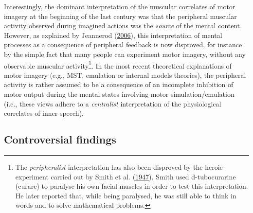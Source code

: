 \documentclass[a4paper,12pt,twoside,openright,oldfontcommands]{memoir}
\let\rmarkdownfootnote\footnote%
\def\footnote{\protect\rmarkdownfootnote}
\begin{document}
Interestingly, the dominant interpretation of the muscular correlates of motor imagery at the beginning of the last century was that the peripheral muscular activity observed during imagined actions was the \emph{source} of the mental content. However, as explained by Jeannerod (\protect\hyperlink{ref-jeannerod_motor_2006}{2006}), this interpretation of mental processes as a consequence of peripheral feedback is now disproved, for instance by the simple fact that many people can experiment motor imagery, without any observable muscular activity\footnote{The \emph{peripheralist} interpretation has also been disproved by the heroic experiment carried out by Smith et al. (\protect\hyperlink{ref-smith_lack_1947}{1947}). Smith used d-tubocurarine (curare) to paralyse his own facial muscles in order to test this interpretation. He later reported that, while being paralysed, he was still able to think in words and to solve mathematical problems.}. In the most recent theoretical explanations of motor imagery (e.g., MST, emulation or internal models theories), the peripheral activity is rather assumed to be a consequence of an incomplete inhibition of motor output during the mental states involving motor simulation/emulation (i.e., these views adhere to a \emph{centralist} interpretation of the physiological correlates of inner speech).

\hypertarget{controversial-findings}{%
\subsection{Controversial findings}\label{controversial-findings}}
\end{document}
